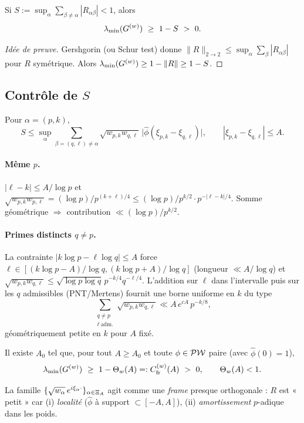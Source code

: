 \documentclass[11pt,a4paper]{proofarticle}
\begin{document}
\begin{lemma}\label{lem:gershgorin}
Si $S:=\sup_{\alpha}\sum_{\beta\ne\alpha}|R_{\alpha\beta}|<1$, alors
\[
\lambda_{\min}(\Gpw)\ \ge\ 1-S\ >\ 0.
\]
\end{lemma}

\begin{proof}[Idée de preuve]
Gershgorin (ou Schur test) donne $\|R\|_{2\to 2}\le \sup_\alpha\sum_\beta|R_{\alpha\beta}|$ pour $R$ symétrique.
Alors $\lambda_{\min}(G^{(w)})\ge 1-\|R\|\ge 1-S$.
\end{proof}

\subsection{\texorpdfstring{Contrôle de $S$}{Contrôle de S}}
Pour $\alpha=(p,k)$,
\[
S\le \sup_\alpha \sum_{\beta=(q,\ell)\ne\alpha}\sqrt{w_{p,k}w_{q,\ell}}\,\big|\widehat\phi(\xi_{p,k}-\xi_{q,\ell})\big|,
\qquad
|\xi_{p,k}-\xi_{q,\ell}|\le A.
\]
\paragraph{Même $p$.} $|\ell-k|\le A/\log p$ et
$\sqrt{w_{p,k}w_{p,\ell}}=(\log p)/p^{(k+\ell)/4}\le (\log p)/p^{k/2}\cdot p^{-|\ell-k|/4}$.
Somme géométrique $\Rightarrow$ contribution $\ll (\log p)/p^{k/2}$.

\paragraph{Primes distincts $q\ne p$.}
La contrainte $|k\log p-\ell\log q|\le A$ force $\ell\in [(k\log p-A)/\log q,(k\log p+A)/\log q]$ (longueur $\ll A/\log q$)
et $\sqrt{w_{p,k}w_{q,\ell}}\le \sqrt{\log p\log q}\,p^{-k/4}q^{-\ell/4}$. L’addition sur $\ell$ dans l’intervalle puis sur
les $q$ admissibles (PNT/Mertens) fournit une borne uniforme en $k$ du type
\[
\sum_{\substack{q\ne p\\ \ell\ \text{adm.}}}\sqrt{w_{p,k}w_{q,\ell}}\ll A\,e^{cA}\,p^{-k/8},
\]
géométriquement petite en $k$ pour $A$ fixé.

\begin{proposition}\label{prop:T2}
Il existe $A_0$ tel que, pour tout $A\ge A_0$ et toute $\phi\in\mathcal{PW}$ paire (avec $\widehat\phi(0)=1$),
\[
\lambda_{\min}(\Gpw)\ \ge\ 1-\Thetaw(A)=:\Cfrw(A)\ >\ 0,\qquad \Thetaw(A)<1.
\]
\end{proposition}

\begin{remark}
La famille $\{\sqrt{w_\alpha}\,e^{i\xi_\alpha\cdot}\}_{\alpha\in\Xi_A}$ agit comme une \emph{frame} presque orthogonale :
$R$ est « petit » car (i) \emph{localité} ($\widehat\phi$ à support $\subset[-A,A]$), (ii) \emph{amortissement} $p$-adique dans les poids.
\end{remark}
\end{document}
